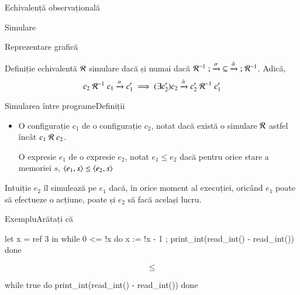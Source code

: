 \documentclass[xcolor=pdftex,romanian,colorlinks]{beamer}
\begin{document}
\begin{section}{Echivalență observațională}
\begin{subsection}{Simulare}
\begin{frame}{Reprezentare grafică}
\begin{block}{Definiție echivalentă}
 $\cal R$ simulare dacă și numai dacă ${\cal R}^{-1} \mathrel{;} {\xrightarrow{\alpha}} \subseteq   {\xrightarrow{\hat{\alpha}}}  \mathrel{;} {\cal R}^{-1}$.  Adică, 
\[c_2 \mathrel{{\cal R}^{-1}} c_1 \xrightarrow{\alpha} c_1'  \implies (\exists c_2')
c_2 \xrightarrow{\hat{\alpha}} c_2' \mathrel{{\cal R}^{-1}} c_1' \]
\end{block}
\end{frame}



\begin{frame}{Simularea între programe}{Definiții}
\begin{itemize}
\item O configurație $c_1$  de o configurație $c_2$, notat  dacă există o simulare $\cal R$ astfel încât $c_1 \mathrel{\cal R} c_2$.

\vitem O expresie $e_1$  de o expresie $e_2$, notat $e_1 \leq e_2$ dacă pentru orice stare a memoriei $s$,  ${\langle{e_1,s}\rangle}\leq {\ensuremath \langle{e_2,s}\rangle}$
\end{itemize}

\begin{block}{Intuiție}
$e_2$ îl simulează  pe $e_1$ dacă, în orice moment al execuției, oricând $e_1$ poate să efectueze o acțiune, poate și $e_2$ să facă același lucru.
\end{block}
\end{frame}

\begin{frame}[fragile]{Exemplu}{Arătați că}
\ 

\hfill\begin{minipage}{.42\columnwidth}
\begin{asciiml}
let x = ref 3 in
while 0 <= !x do 
  x := !x - 1 ;
  print_int(read_int() - read_int())
done
\end{asciiml}
\end{minipage}
\hfill\begin{minipage}{.05\columnwidth}
\LARGE \[\leq\]
\end{minipage}
\hfill\begin{minipage}{.42\columnwidth}
\begin{asciiml}
while true do 
  print_int(read_int() - read_int())
done
\end{asciiml}
\end{minipage}
\end{frame}


\end{subsection}
\end{section}
\end{document}
